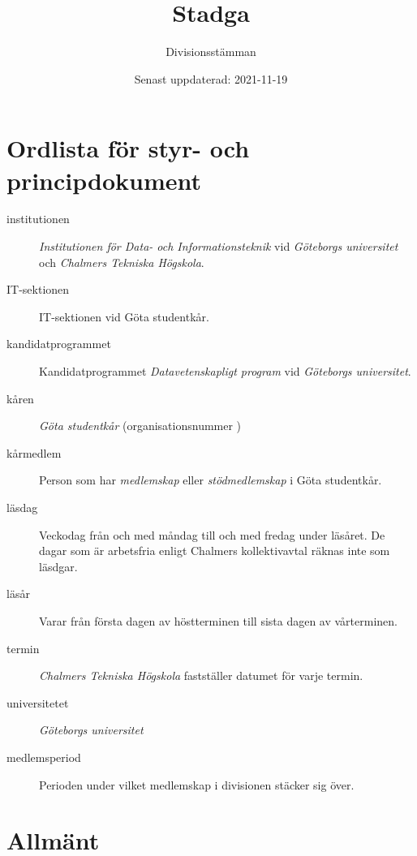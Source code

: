 \documentclass{dvd}
\begin{document}
	\title{Stadga}
	\author{Divisionsstämman}
	\date{Senast uppdaterad: 2021-11-19}

        \section{Ordlista för styr- och principdokument}

	\begin{description}
		\item[institutionen] \emph{Institutionen för Data- och Informationsteknik} vid \emph{Göteborgs universitet} och \emph{Chalmers Tekniska Högskola}.

		\item[IT-sektionen] IT-sektionen vid Göta studentkår.

		\item[kandidatprogrammet] Kandidatprogrammet \emph{Datavetenskapligt program} vid \emph{Göteborgs universitet}.

		\item[kåren] \emph{Göta studentkår} (organisationsnummer )

		\item[kårmedlem] Person som har \emph{medlemskap} eller \emph{stödmedlemskap} i Göta studentkår.

		\item[läsdag] Veckodag från och med måndag till och med fredag under läsåret.
					  De dagar som är arbetsfria enligt Chalmers kollektivavtal räknas inte som läsdgar.

		\item[läsår] Varar från första dagen av höstterminen till sista dagen av vårterminen.

		\item[termin] \emph{Chalmers Tekniska Högskola} fastställer datumet för varje termin.

		\item[universitetet] \emph{Göteborgs universitet}

                \item[medlemsperiod] Perioden under vilket medlemskap i divisionen stäcker sig över.
	\end{description}

	\section{Allmänt}
\end{document}
